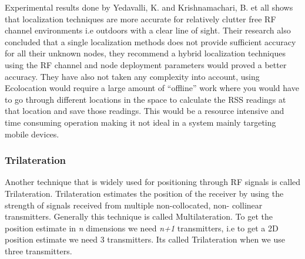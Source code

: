 Experimental results done by Yedavalli, K. and Krishnamachari, B.
et all shows that localization techniques are more accurate for relatively
clutter free RF channel environments i.e outdoors with a clear line
of sight. Their research also concluded that a single localization
methods does not provide sufficient accuracy for all their unknown
nodes, they recommend a hybrid localization techniques using the
RF channel and node deployment parameters would proved a better accuracy.
They have also not taken any complexity into account, using Ecolocation
would require a large amount of ``offline'' work where you would
have to go through different locations in the space to calculate the
RSS readings at that location and save those readings. This would
be a resource intensive and time consuming operation making it not
ideal in a system mainly targeting mobile devices.


\subsubsection{Trilateration} \label{trilateration_section}
Another technique that is widely used for positioning through RF signals is called Trilateration. Trilateration estimates the position of the receiver by using the strength of signals received from multiple non-collocated, non- collinear transmitters\cite{trilat-characteristics}. Generally this technique is called Multilateration. To get the position estimate in \textit{n} dimensions we need \textit{n+1} transmitters, i.e to get a 2D position estimate we need 3 transmitters. Its called Trilateration when we use three transmitters.


